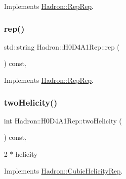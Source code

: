 Implements \mbox{\hyperlink{structHadron_1_1RepRep_ab3213025f6de249f7095892109575fde}{Hadron\+::\+Rep\+Rep}}.

\mbox{\label{structHadron_1_1H0D4A1Rep_afbedc9857e7215106a2225ff351ada68}} 
\subsubsection{\texorpdfstring{rep()}{rep()}\hspace{0.1cm}{\footnotesize\ttfamily [5/5]}}
{\footnotesize\ttfamily std\+::string Hadron\+::\+H0\+D4\+A1\+Rep\+::rep (\begin{DoxyParamCaption}{ }\end{DoxyParamCaption}) const\hspace{0.3cm}{\ttfamily [inline]}, {\ttfamily [virtual]}}



Implements \mbox{\hyperlink{structHadron_1_1RepRep_ab3213025f6de249f7095892109575fde}{Hadron\+::\+Rep\+Rep}}.

\mbox{\label{structHadron_1_1H0D4A1Rep_a2aa89f84616ec32830d7b607b5a0b513}} 
\subsubsection{\texorpdfstring{twoHelicity()}{twoHelicity()}\hspace{0.1cm}{\footnotesize\ttfamily [1/3]}}
{\footnotesize\ttfamily int Hadron\+::\+H0\+D4\+A1\+Rep\+::two\+Helicity (\begin{DoxyParamCaption}{ }\end{DoxyParamCaption}) const\hspace{0.3cm}{\ttfamily [inline]}, {\ttfamily [virtual]}}

2 $\ast$ helicity 

Implements \mbox{\hyperlink{structHadron_1_1CubicHelicityRep_af507aa56fc2747eacc8cb6c96db31ecc}{Hadron\+::\+Cubic\+Helicity\+Rep}}.

\mbox{\label{structHadron_1_1H0D4A1Rep_a2aa89f84616ec32830d7b607b5a0b513}} 
